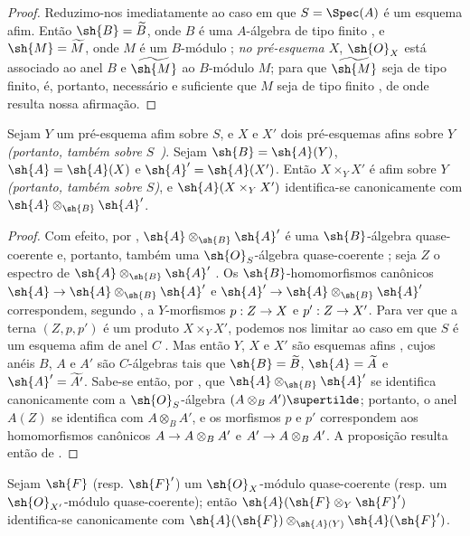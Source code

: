 \documentclass[oneside,10pt]{amsart}
\makeatletter
\newcommand{\ega@arrow}[2]{\mathchoice{#1}{#2}{#2}{#2}}
\renewcommand{\to}{\ega@arrow{\longrightarrow}{\rightarrow}}
\let\EGAOriginalLabel\label
\renewcommand{\label}[1]{\phantomsection\EGAOriginalLabel{#1}}
\makeatother
\begin{document}
\begin{proof}
Reduzimo-nos imediatamente ao caso em que $S=\Spec(A)$ é um esquema afim.
Então $\sh{B}=\widetilde{B}$, onde $B$ é uma $A$-álgebra de tipo finito , e $\sh{M}=\widetilde{M}$, onde $M$ é um $B$-módulo ; \emph{no pré-esquema $X$}, $\sh{O}_X$ está associado ao anel $B$ e $\widetilde{\sh{M}}$ ao $B$-módulo $M$; para que $\widetilde{\sh{M}}$ seja de tipo finito, é, portanto, necessário e suficiente que $M$ seja de tipo finito , de onde resulta nossa afirmação.
\end{proof}

\begin{proposition}[1.4.6]
\label{II.1.4.6}
Sejam $Y$ um pré-esquema afim sobre $S$, e $X$ e $X'$ dois pré-esquemas afins sobre $Y$ \emph{(portanto, também sobre $S$~)}.
Sejam $\sh{B}=\sh{A}(Y)$, $\sh{A}=\sh{A}(X)$ e $\sh{A}'=\sh{A}(X')$.
Então $X\times_Y X'$ é afim sobre $Y$ \emph{(portanto, também sobre $S$)}, e $\sh{A}(X\times_Y X')$ identifica-se canonicamente com $\sh{A}\otimes_\sh{B}\sh{A}'$.
\end{proposition}

\begin{proof}
Com efeito, por , $\sh{A}\otimes_\sh{B}\sh{A}'$ é uma $\sh{B}$-álgebra quase-coerente e, portanto, também uma $\sh{O}_S$-álgebra quase-coerente ; seja $Z$ o espectro de $\sh{A}\otimes_\sh{B}\sh{A}'$ .
Os $\sh{B}$-homomorfismos canônicos $\sh{A}\to\sh{A}\otimes_\sh{B}\sh{A}'$ e $\sh{A}'\to\sh{A}\otimes_\sh{B}\sh{A}'$ correspondem, segundo , a $Y$-morfismos $p:Z\to X$ e $p':Z\to X'$.
Para ver que a terna $(Z,p,p')$ é um produto $X\times_Y X'$, podemos nos limitar ao caso em que $S$ é um esquema afim de anel $C$ .
Mas então $Y$, $X$ e $X'$ são esquemas afins , cujos anéis $B$, $A$ e $A'$ são $C$-álgebras tais que $\sh{B}=\widetilde{B}$, $\sh{A}=\widetilde{A}$ e $\sh{A}'=\widetilde{A'}$.
Sabe-se então, por , que $\sh{A}\otimes_\sh{B}\sh{A}'$ se identifica canonicamente com a $\sh{O}_S$-álgebra $(A\otimes_B A')\supertilde$; portanto, o anel $A(Z)$ se identifica com $A\otimes_B A'$, e os morfismos $p$ e $p'$ correspondem aos homomorfismos canônicos $A\to A\otimes_B A'$ e $A'\to A\otimes_B A'$.
A proposição resulta então de .
\end{proof}

\begin{corollary}[1.4.7]
\label{II.1.4.7}
Sejam $\sh{F}$ (resp. $\sh{F}'$) um $\sh{O}_X$-módulo quase-coerente (resp. um $\sh{O}_{X'}$-módulo quase-coerente); então $\sh{A}(\sh{F}\otimes_Y\sh{F}')$ identifica-se canonicamente com $\sh{A}(\sh{F})\otimes_{\sh{A}(Y)}\sh{A}(\sh{F}')$.
\end{corollary}
\end{document}
